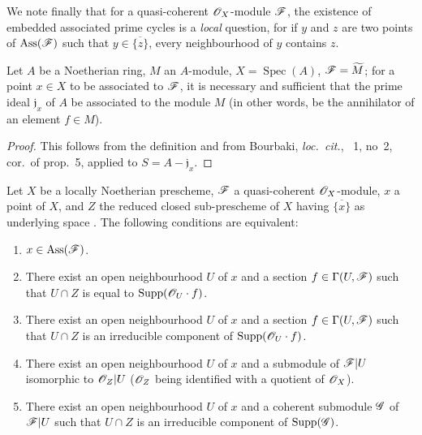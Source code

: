 We note finally that for a quasi-coherent $\mathscr{O}_X$-module $\mathscr{F}$, the existence of embedded associated prime cycles is a \emph{local} question, for if $y$ and $z$ are two points of $\operatorname{Ass}(\mathscr{F})$ such that $y\in\overline{\{z\}}$, every neighbourhood of $y$ contains $z$.

\begin{proposition}[3.1.2]
\label{IV.3.1.2}
Let $A$ be a Noetherian ring, $M$ an $A$-module, $X=\operatorname{Spec}(A)$, $\mathscr{F}=\widetilde{M}$; for a point $x\in X$ to be associated to $\mathscr{F}$, it is necessary and sufficient that the prime ideal $\mathfrak{j}_x$ of $A$ be associated to the module $M$ (in other words, be the annihilator of an element $f\in M$).
\end{proposition}

\begin{proof}
This follows from the definition  and from Bourbaki, \emph{loc.\ cit.}, \textsection~1, no~2, cor.\ of prop.~5, applied to $S=A-\mathfrak{j}_x$.
\end{proof}

\begin{proposition}[3.1.3]
\label{IV.3.1.3}
Let $X$ be a locally Noetherian prescheme, $\mathscr{F}$ a quasi-coherent $\mathscr{O}_X$-module, $x$ a point of $X$, and $Z$ the reduced closed sub-prescheme of $X$ having $\overline{\{x\}}$ as underlying space .
The following conditions are equivalent:
\begin{enumerate}
  \item[\emph{a)}] $x\in\operatorname{Ass}(\mathscr{F})$.
  \item[\emph{b)}] There exist an open neighbourhood $U$ of $x$ and a section $f\in\Gamma(U,\mathscr{F})$ such that $U\cap Z$ is equal to $\operatorname{Supp}(\mathscr{O}_U\cdot f)$.
  \item[\emph{b$'$)}] There exist an open neighbourhood $U$ of $x$ and a section $f\in\Gamma(U,\mathscr{F})$ such that $U\cap Z$ is an irreducible component of $\operatorname{Supp}(\mathscr{O}_U\cdot f)$.
  \item[\emph{c)}] There exist an open neighbourhood $U$ of $x$ and a submodule of $\mathscr{F}|U$ isomorphic to $\mathscr{O}_Z|U$ ($\mathscr{O}_Z$ being identified with a quotient of $\mathscr{O}_X$).
  \item[\emph{c$'$)}] There exist an open neighbourhood $U$ of $x$ and a coherent submodule $\mathscr{G}$ of $\mathscr{F}|U$ such that $U\cap Z$ is an irreducible component of $\operatorname{Supp}(\mathscr{G})$.
\end{enumerate}
\end{proposition}

